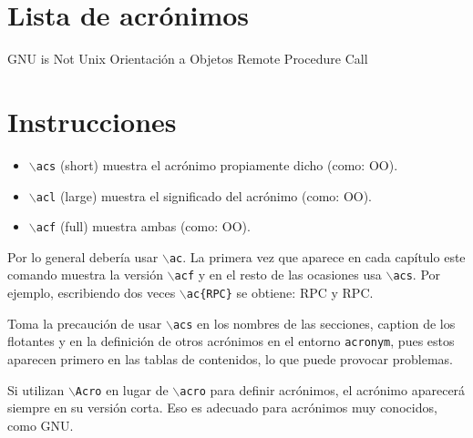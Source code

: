 \documentclass[a4paper, 11pt]{article}
\title{}
\def\texcmd#1{\texttt{$\backslash$#1}}
\begin{document}
\maketitle


\section{Lista de acrónimos}

{\small
\begin{acronym}[XXXXXXXX]
       {\acs{GNU} is Not Unix}
        {Orientación a Objetos}
       {Remote Procedure Call}
\end{acronym}
}


\section{Instrucciones}

\begin{itemize}
\item \texcmd{acs} (short) muestra el acrónimo propiamente dicho (como: \acs{OO}).
\item \texcmd{acl} (large) muestra el significado del acrónimo (como: \acl{OO}).
\item \texcmd{acf} (full) muestra ambas (como: \acf{OO}).
\end{itemize}

Por lo general debería usar \texcmd{ac}. La primera vez que aparece en cada capítulo este
comando muestra la versión \texcmd{acf} y en el resto de las ocasiones usa
\texcmd{acs}. Por ejemplo, escribiendo dos veces \texcmd{ac\{RPC\}} se obtiene: \ac{RPC} y
\ac{RPC}.

Toma la precaución de usar \texcmd{acs} en los nombres de las secciones, caption de los
flotantes y en la definición de otros acrónimos en el entorno \texttt{acronym}, pues estos
aparecen primero en las tablas de contenidos, lo que puede provocar problemas.

Si utilizan \texcmd{Acro} en lugar de \texcmd{acro} para definir acrónimos, el acrónimo
aparecerá siempre en su versión corta. Eso es adecuado para acrónimos muy conocidos, como
\ac{GNU}.
\end{document}
